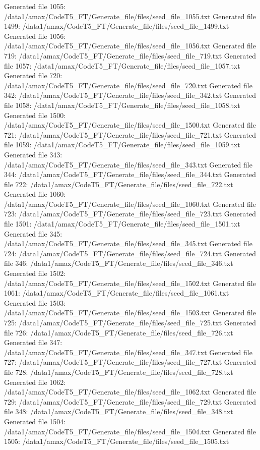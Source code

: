 Generated file 1055: /data1/amax/CodeT5_FT/Generate_file/files/seed_file_1055.txt
Generated file 1499: /data1/amax/CodeT5_FT/Generate_file/files/seed_file_1499.txt
Generated file 1056: /data1/amax/CodeT5_FT/Generate_file/files/seed_file_1056.txt
Generated file 719: /data1/amax/CodeT5_FT/Generate_file/files/seed_file_719.txt
Generated file 1057: /data1/amax/CodeT5_FT/Generate_file/files/seed_file_1057.txt
Generated file 720: /data1/amax/CodeT5_FT/Generate_file/files/seed_file_720.txt
Generated file 342: /data1/amax/CodeT5_FT/Generate_file/files/seed_file_342.txt
Generated file 1058: /data1/amax/CodeT5_FT/Generate_file/files/seed_file_1058.txt
Generated file 1500: /data1/amax/CodeT5_FT/Generate_file/files/seed_file_1500.txt
Generated file 721: /data1/amax/CodeT5_FT/Generate_file/files/seed_file_721.txt
Generated file 1059: /data1/amax/CodeT5_FT/Generate_file/files/seed_file_1059.txt
Generated file 343: /data1/amax/CodeT5_FT/Generate_file/files/seed_file_343.txt
Generated file 344: /data1/amax/CodeT5_FT/Generate_file/files/seed_file_344.txt
Generated file 722: /data1/amax/CodeT5_FT/Generate_file/files/seed_file_722.txt
Generated file 1060: /data1/amax/CodeT5_FT/Generate_file/files/seed_file_1060.txt
Generated file 723: /data1/amax/CodeT5_FT/Generate_file/files/seed_file_723.txt
Generated file 1501: /data1/amax/CodeT5_FT/Generate_file/files/seed_file_1501.txt
Generated file 345: /data1/amax/CodeT5_FT/Generate_file/files/seed_file_345.txt
Generated file 724: /data1/amax/CodeT5_FT/Generate_file/files/seed_file_724.txt
Generated file 346: /data1/amax/CodeT5_FT/Generate_file/files/seed_file_346.txt
Generated file 1502: /data1/amax/CodeT5_FT/Generate_file/files/seed_file_1502.txt
Generated file 1061: /data1/amax/CodeT5_FT/Generate_file/files/seed_file_1061.txt
Generated file 1503: /data1/amax/CodeT5_FT/Generate_file/files/seed_file_1503.txt
Generated file 725: /data1/amax/CodeT5_FT/Generate_file/files/seed_file_725.txt
Generated file 726: /data1/amax/CodeT5_FT/Generate_file/files/seed_file_726.txt
Generated file 347: /data1/amax/CodeT5_FT/Generate_file/files/seed_file_347.txt
Generated file 727: /data1/amax/CodeT5_FT/Generate_file/files/seed_file_727.txt
Generated file 728: /data1/amax/CodeT5_FT/Generate_file/files/seed_file_728.txt
Generated file 1062: /data1/amax/CodeT5_FT/Generate_file/files/seed_file_1062.txt
Generated file 729: /data1/amax/CodeT5_FT/Generate_file/files/seed_file_729.txt
Generated file 348: /data1/amax/CodeT5_FT/Generate_file/files/seed_file_348.txt
Generated file 1504: /data1/amax/CodeT5_FT/Generate_file/files/seed_file_1504.txt
Generated file 1505: /data1/amax/CodeT5_FT/Generate_file/files/seed_file_1505.txt
